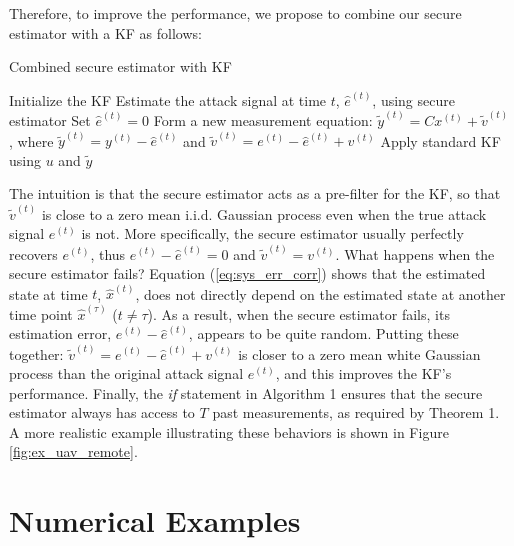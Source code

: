 \documentclass[../../thesis.tex]{subfiles}
\begin{document}
Therefore, to improve the performance, we propose to combine our secure estimator with a KF as follows:
\begin{algorithm}
\caption{Combined secure estimator with KF}
\label{al:se_kf}
\begin{algorithmic}[1]
\State Initialize the KF
		\State Estimate the attack signal at time $t$, $\hat e^{(t)}$, using secure estimator
	\Else
		\State Set $\hat e^{(t)} = 0$
	\EndIf
	\State Form a new measurement equation: $\tilde y^{(t)} =  C x^{(t)} + \tilde v^{(t)}$, where $\tilde y^{(t)} = y^{(t)} - \hat e^{(t)}$ and $ \tilde v^{(t)} = e ^{(t)} - \hat e^{(t)} + v^{(t)}$
	\State Apply standard KF using $u$ and $\tilde y$ 
\EndFor
\end{algorithmic}
\end{algorithm}
The intuition is that the secure estimator acts as a pre-filter for the KF, so that $\tilde v^{(t)}$ is close to a zero mean i.i.d. Gaussian process even when the true attack signal $e^{(t)}$ is not. More specifically, the secure estimator usually perfectly recovers $e^{(t)}$, thus $e^{(t)} - \hat e^{(t)} = 0$ and $\tilde v^{(t)} = v^{(t)}$. What happens when the secure estimator fails? Equation (\ref{eq:sys_err_corr}) shows that the estimated state at time $t$, $\hat x^{(t)}$, %
does not directly depend on the estimated state at another time point $\hat x^{(\tau)}$ ($t \neq \tau$). As a result, when the secure estimator fails, its estimation error, $e^{(t)} - \hat e^{(t)}$, appears to be quite random. Putting these together: $\tilde v^{(t)} = e^{(t)} - \hat e^{(t)} + v^{(t)}$ is closer to a zero mean white Gaussian process than the original attack signal $e^{(t)}$, and this improves the KF's performance. 
Finally, the \textit{if} statement in Algorithm 1 ensures that the secure estimator always has access to $T$ past measurements, as required by Theorem 1.
A more realistic example illustrating these behaviors is shown in Figure \ref{fig:ex_uav_remote}.

\section{Numerical Examples}\label{sec:examples}
\end{document}
